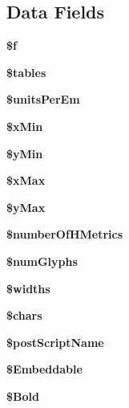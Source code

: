 \subsection*{Data Fields}
\begin{DoxyCompactItemize}
\item 
{\bfseries \$f}\label{class_t_t_f_parser_a23c42e7d231a63025b55e4eb7e3d4c99}

\item 
{\bfseries \$tables}\label{class_t_t_f_parser_a3d332a3c374a53802495dcb045f6133f}

\item 
{\bfseries \$units\+Per\+Em}\label{class_t_t_f_parser_a7ad7f3754b5c9e1be31cb2e8fbc1f8bc}

\item 
{\bfseries \$x\+Min}\label{class_t_t_f_parser_a54256cf6ec5bc64ce4982e0823aa9843}

\item 
{\bfseries \$y\+Min}\label{class_t_t_f_parser_aef474f9987ef420f3418c72a58efaae2}

\item 
{\bfseries \$x\+Max}\label{class_t_t_f_parser_a0df7e5657325300b4d14176d2fd93e53}

\item 
{\bfseries \$y\+Max}\label{class_t_t_f_parser_aacbad7d96042ef3efe4e749be0f7b77d}

\item 
{\bfseries \$number\+Of\+H\+Metrics}\label{class_t_t_f_parser_ad29e59d3eef4cad941b9d7ad48af90f0}

\item 
{\bfseries \$num\+Glyphs}\label{class_t_t_f_parser_a9ba446a8cdf89e4eaf97c293ddf42ce7}

\item 
{\bfseries \$widths}\label{class_t_t_f_parser_afddb0dbfdce0d987a6201b6f64c2f4b3}

\item 
{\bfseries \$chars}\label{class_t_t_f_parser_ad5ebe8d7cc2e0f99a2ca9165c68677d8}

\item 
{\bfseries \$post\+Script\+Name}\label{class_t_t_f_parser_aee9988660932b40a6622f417e342c388}

\item 
{\bfseries \$\+Embeddable}\label{class_t_t_f_parser_a58354ffa47c32751b1730d2d12a77d70}

\item 
{\bfseries \$\+Bold}\label{class_t_t_f_parser_ace168841f596f69882785808119b95a8}


\end{DoxyCompactItemize}
